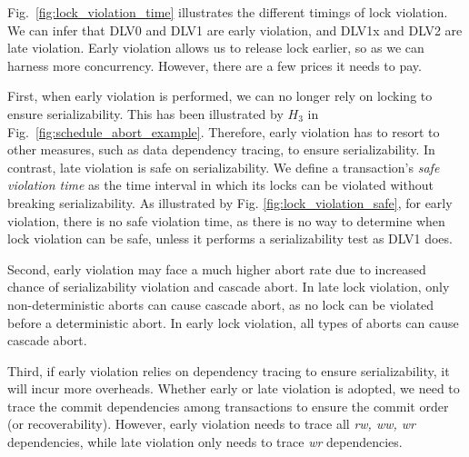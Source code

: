 \documentclass[conference]{IEEEtran}
\begin{document}
Fig.~\ref{fig:lock_violation_time} illustrates the different timings of lock violation.
We can infer that DLV0 and DLV1 are early violation, and DLV1x and DLV2 are late violation.
Early violation allows us to release lock earlier, so as we can harness more concurrency. However, there are a few prices it needs to pay.

First, when early violation is performed, we can no longer rely on locking to ensure serializability. This has been illustrated by ${H_3}$ in Fig.~\ref{fig:schedule_abort_example}.
Therefore, early violation has to resort to other measures, such as data dependency tracing, to ensure serializability.
In contrast, late violation is safe on serializability.
We define a transaction's \emph{safe violation time} as the time interval in which its locks can be violated without breaking serializability.
As illustrated by Fig. \ref{fig:lock_violation_safe},
for early violation, there is no safe violation time, as there is no way to determine when lock violation can be safe, unless it performs a serializability test as DLV1 does.

Second, early violation may face a much higher abort rate due to increased chance of serializability violation and cascade abort.
In late lock violation, only non-deterministic aborts can cause cascade abort, as no lock can be violated before a deterministic abort.
In early lock violation, all types of aborts can cause cascade abort.

Third, if early violation relies on dependency tracing to ensure serializability, it will incur more overheads. 
Whether early or late violation is adopted, we need to trace the commit dependencies among transactions to ensure the commit order (or recoverability).
However, early violation needs to trace all \emph{rw, ww, wr} dependencies, while late violation only needs to trace \emph{wr} dependencies.
\end{document}
